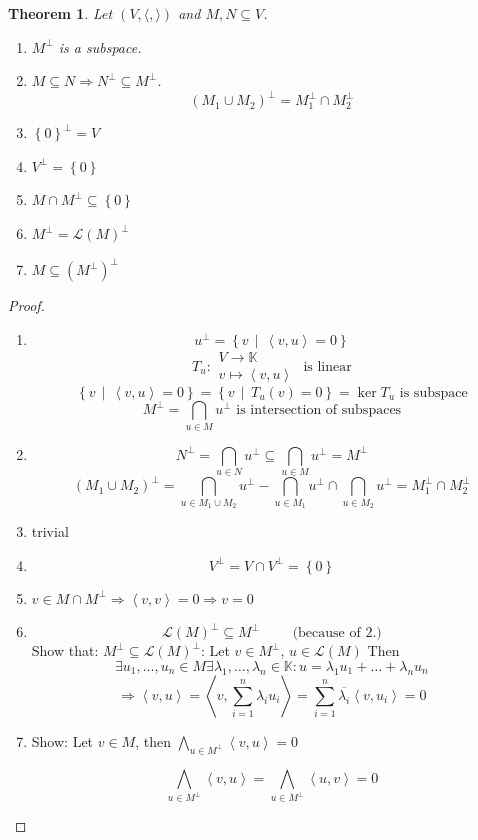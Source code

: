 \documentclass[a4paper,landscape,twocolumn]{article}
\newcommand\set[1]{\left\{#1\right\}}
\newcommand\setdef[2]{\left\{#1\,\middle|\,#2\right\}}
\newcommand\functional[1]{\left\langle{#1}\right\rangle}
\newtheorem{theorem}{Theorem}
\DeclareMathOperator\kernel{ker} %
\begin{document}
\begin{theorem}
  \label{satz-8.41}
  Let $(V, \langle, \rangle)$ and $M,N \subseteq V$.
  \begin{enumerate}
    \item $M^\bot$ is a subspace.
    \item $M \subseteq N \Rightarrow N^\bot \subseteq M^\bot$.
      \[ (M_1 \cup M_2)^\bot = M_1^\bot \cap M_2^\bot \]
    \item $\set{0}^\bot = V$
    \item $V^\bot = \set{0}$
    \item $M \cap M^\bot \subseteq \set{0}$
    \item $M^\bot = \mathcal L(M)^\bot$
    \item $M \subseteq (M^\bot)^\bot$
  \end{enumerate}
\end{theorem}
\begin{proof}
  \begin{enumerate}
    \item
      \[ u^\bot = \setdef{v}{\functional{v,u} = 0} \]
      \[ T_u: \substack{V \to \mathbb K \\ v \mapsto \functional{v,u}} \text{ is linear} \]
      \[ \setdef{v}{\functional{v,u} = 0} = \setdef{v}{T_u(v) = 0} = \kernel{T_u} \text{ is subspace} \]
      \[ M^\bot = \bigcap_{u \in M} u^\bot \text{ is intersection of subspaces} \]
    \item
      \[ N^\bot = \bigcap_{u \in N} u^\bot \subseteq \bigcap_{u \in M} u^\bot = M^\bot \]
      \[
        (M_1 \cup M_2)^\bot
        = \bigcap_{u \in M_1 \cup M_2} u^\bot - \bigcap_{u \in M_1} u^\bot \cap \bigcap_{u \in M_2} u^\bot
        = M_1^\bot \cap M_2^\bot
      \]
    \item trivial
    \item
      \[ V^\bot = V \cap V^\bot = \set{0} \]
    \item $v \in M \cap M^\bot \Rightarrow \functional{v,v} = 0 \Rightarrow v = 0$
    \item
      \[ \mathcal L(M)^\bot \subseteq M^\bot \qquad \text{ (because of 2.)} \]
      Show that: $M^\bot \subseteq \mathcal L(M)^\bot$: Let $v \in M^\bot$, $u \in \mathcal L(M)$
      Then
      \[ \exists u_1, \ldots, u_n \in M \exists \lambda_1, \ldots, \lambda_n \in \mathbb K:
        u = \lambda_1 u_1 + \ldots + \lambda_n u_n \]
      \[
        \Rightarrow \functional{v,u} = \functional{v,\sum_{i=1}^n \lambda_i u_i}
        = \sum_{i=1}^n \overline{\lambda_i} \functional{v, u_i} = 0
      \]
    \item
      Show: Let $v \in M$, then $\bigwedge_{u \in M^\bot} \functional{v,u} = 0$

      \[ \bigwedge_{u \in M^\bot} \functional{v,u} = \bigwedge_{u \in M^\bot} \functional{u,v} = 0 \]
  \end{enumerate}
\end{proof}
\end{document}
